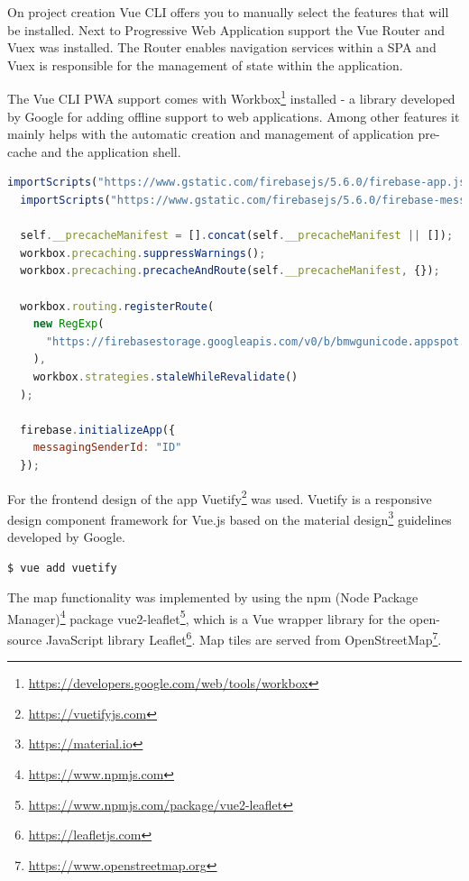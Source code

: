 On project creation Vue CLI offers you to manually select the features that will be installed. Next to Progressive Web Application support the Vue Router and Vuex was installed. The Router enables navigation services within a SPA and Vuex is responsible for the management of state within the application.


The Vue CLI PWA support comes with Workbox\footnote{\url{https://developers.google.com/web/tools/workbox}} installed - a library developed by Google for adding offline support to web applications. Among other features it mainly helps with the automatic creation and management of application pre-cache and the application shell.

\pagebreak

\begin{lstlisting}[language=JavaScript, caption=Service Worker with Workbox and Firebase specific initiation (firebase-messaging-sw.js), label=lst:serviceworker]
  importScripts("https://www.gstatic.com/firebasejs/5.6.0/firebase-app.js");
  importScripts("https://www.gstatic.com/firebasejs/5.6.0/firebase-messaging.js");

  self.__precacheManifest = [].concat(self.__precacheManifest || []);
  workbox.precaching.suppressWarnings();
  workbox.precaching.precacheAndRoute(self.__precacheManifest, {});

  workbox.routing.registerRoute(
    new RegExp(
      "https://firebasestorage.googleapis.com/v0/b/bmwgunicode.appspot.com/.*"
    ),
    workbox.strategies.staleWhileRevalidate()
  );

  firebase.initializeApp({
    messagingSenderId: "ID"
  });

\end{lstlisting}

For the frontend design of the app Vuetify\footnote{\url{https://vuetifyjs.com}} was used. Vuetify is a responsive design component framework for Vue.js based on the material design\footnote{\url{https://material.io}} guidelines developed by Google.

\begin{lstlisting}[language=bash, caption=Command to add Vuetify to a Vue.js project, label=lst:vuetify]
  $ vue add vuetify
\end{lstlisting}

The map functionality was implemented by using the npm (Node Package Manager)\footnote{\url{https://www.npmjs.com}} package vue2-leaflet\footnote{\url{https://www.npmjs.com/package/vue2-leaflet}}, which is a Vue wrapper library for the open-source JavaScript library Leaflet\footnote{\url{https://leafletjs.com}}. Map tiles are served from OpenStreetMap\footnote{\url{https://www.openstreetmap.org}}.

